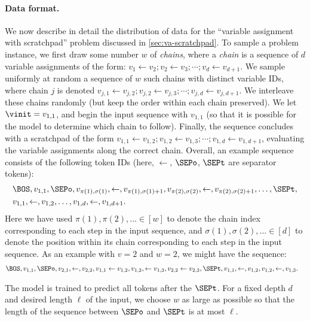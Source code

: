 \documentclass{article}
\begin{document}
\paragraph{Data format.} We now describe in detail the distribution of data for the ``variable assignment with scratchpad'' problem discussed in \cref{sec:va-scratchpad}. 
To sample a problem instance, we first draw some number $w$ of \emph{chains}, where a \emph{chain} is a sequence of $d$ variable assignments of the form: $v_1 \gets v_2; v_2 \gets v_3; \cdots ; v_d \gets v_{d+1}$. We sample uniformly at random a sequence of $w$ such chains with distinct variable IDs, where chain $j$ is denoted $v_{j,1} \gets v_{j,2}; v_{j,2} \gets v_{j,3}; \cdots ; v_{j,d} \gets v_{j,d+1}$. We interleave these chains randomly (but keep the order within each chain preserved). We let $\vinit = v_{1,1}$, and begin the input sequence with $v_{1,1}$ (so that it is possible for the model to determine which chain to follow). Finally, the sequence concludes with a scratchpad of the form $v_{1,1} \gets v_{1,2}; v_{1,2} \gets v_{1,3}; \cdots ; v_{1,d} \gets v_{1,d+1}$, evaluating the variable assignments along the correct chain. Overall, an example sequence consists of the following token IDs (here, $\gets$, $\SEPo$, $\SEPt$ are separator tokens):
\begin{align}
  & \BOS, v_{1,1}, \SEPo, v_{\pi(1), \sigma(1)}, \gets, v_{\pi(1), \sigma(1) + 1}, v_{\pi(2), \sigma(2)}, \gets, v_{\pi(2), \sigma(2) + 1}, \ldots, \SEPt, \nonumber\\
  & v_{1,1}, \gets, v_{1,2}, \ldots, v_{1,d}, \gets, v_{1,d+1}\label{eq:example-pc-cot}.
\end{align}
Here we have used $\pi(1), \pi(2), \ldots \in [w]$ to denote the chain index corresponding to each step in the input sequence, and 
$\sigma(1), \sigma(2), \ldots \in [d]$ to denote the position within its chain corresponding to each step in the input sequence.
As an example with $v = 2$ and $w = 2$, we might have the sequence:
\begin{align}
  & \BOS, v_{1,1}, \SEPo, v_{2,1}, \gets, v_{2,2}, v_{1,1} \gets v_{1,2}, v_{1,2}, \gets v_{1,3}, v_{2,2} \gets v_{2,3}, \SEPt, v_{1,1}, \gets, v_{1,2}, v_{1,2}, \gets, v_{1,3}\nonumber.
\end{align}

The model is trained to predict all tokens after the $\SEPt$. For a fixed depth $d$ and desired length $\ell$ of the input, we choose $w$ as large as possible so that the length of  the sequence between $\SEPo$ and $\SEPt$ is at most $\ell$. 
\end{document}
